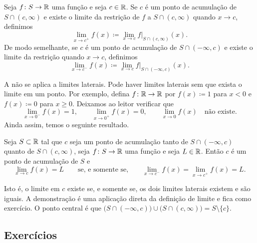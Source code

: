 \begin{defn} \label{defn:onesidedlimits}
Seja $f \colon S \to {\mathbb{R}}$ uma função e seja $c \in {\mathbb{R}}$. Se
$c$ é um ponto de acumulação de
$S \cap (c,\infty)$
e existe o limite
da restrição de $f$ a $S \cap (c,\infty)$
quando $x \to c$, definimos
\begin{equation*}
\lim_{x \to c^+} f(x) \coloneqq \lim_{x\to c} f|_{S \cap (c,\infty)}(x) .
\end{equation*}
De modo semelhante, se $c$ é um ponto de acumulação de
$S \cap (-\infty,c)$ e existe o limite da restrição quando $x \to c$,
definimos
\begin{equation*}
\lim_{x \to c^-} f(x) \coloneqq \lim_{x\to c} f|_{S \cap (-\infty,c)}(x) .
\end{equation*}
\end{defn}

A  não se aplica a limites laterais.
Pode haver limites laterais sem que exista o limite em um ponto. Por
exemplo, defina $f \colon {\mathbb{R}} \to {\mathbb{R}}$ por $f(x) \coloneqq 1$ para $x < 0$ e
$f(x) \coloneqq 0$ para $x \geq 0$.
Deixamos ao leitor verificar que
\begin{equation*}
\lim_{x \to 0^-} f(x) = 1, \qquad
\lim_{x \to 0^+} f(x) = 0, \qquad
\lim_{x \to 0} f(x) \quad \text{não existe.}
\end{equation*}
Ainda assim, temos o seguinte resultado.

\begin{prop} \label{prop:onesidedlimits}
Seja $S \subset {\mathbb{R}}$ tal que $c$ seja um ponto de acumulação
tanto de $S \cap (-\infty,c)$ quanto de $S \cap (c,\infty)$, seja
$f \colon S \to {\mathbb{R}}$ uma função e seja $L \in {\mathbb{R}}$. Então $c$ é um ponto de acumulação de $S$ e
\begin{equation*}
\lim_{x \to c} f(x) = L
\qquad \text{se, e somente se,} \qquad
\lim_{x \to c^-} f(x) =
\lim_{x \to c^+} f(x) =
L .
\end{equation*}
\end{prop}

Isto é, o limite em $c$ existe se, e somente se, os dois limites laterais existem e são iguais. A
demonstração é uma aplicação direta da definição de limite e fica como exercício. O ponto central é que
$\bigl( S \cap (-\infty,c) \bigr) \cup \bigl( S \cap (c,\infty) \bigr)
= S \setminus \{ c \}$.



\subsection{Exercícios}


